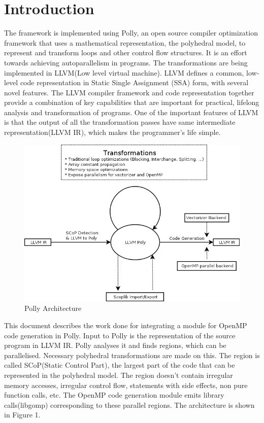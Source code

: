 \documentclass[a4paper,10pt]{article}
\begin{document}
\section{Introduction}
The framework is implemented using Polly\cite{pollywiki}, an open source\cite{lice}
compiler optimization framework that uses a
mathematical representation, the polyhedral model, to represent and transform
loops and other control flow
structures. It is an effort towards achieving autoparallelism in programs. The
transformations are being implemented in LLVM(Low level virtual machine)\cite{llvm}.
LLVM defines a common, low-level code representation in Static Single Assignment
(SSA) form, with several novel features. The LLVM compiler framework and
code representation together provide a combination of key capabilities that are
important for practical, lifelong analysis and transformation of programs. One
of the important features of LLVM is that the output of all the transformation
passes have same intermediate representation(LLVM IR), which makes the programmer's life
simple.
\begin{figure}[h]
\begin{center}
\includegraphics[scale=0.40]{LLVMPoly.png}
\caption{Polly Architecture}
\end{center}
\end{figure}

This document describes the work done for integrating a module for OpenMP\cite{openmp} code
generation in Polly. Input to Polly is the representation of the source program in LLVM IR. Polly
analyses it and finds regions, which can be parallelised. Necessary polyhedral transformations are made on this.
The region is called SCoP(Static Control Part)\cite{scop}, the
largest part of the code that can be represented in the polyhedral model\cite{pluto}.
The region doesn't contain irregular memory accesses, irregular 
control flow, statements with side effects, non pure function calls, etc. 
The OpenMP code generation module emits library calls(libgomp)\cite{libgomp} corresponding to these parallel regions.
The architecture is shown in Figure 1.
\end{document}
